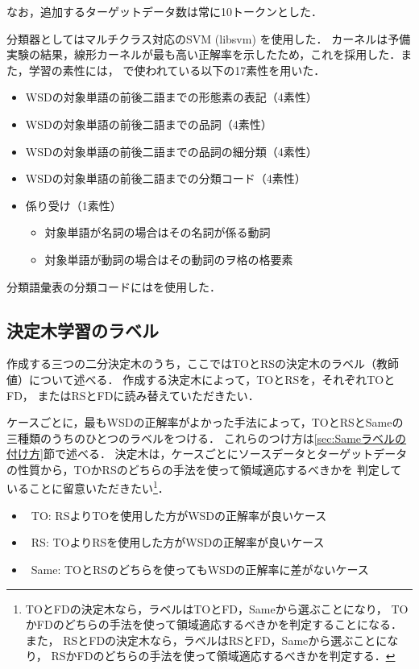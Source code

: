 \documentclass[japanese]{jnlp_1.4}
\begin{document}
なお，追加するターゲットデータ数は常に10トークンとした．

分類器としてはマルチクラス対応のSVM (libsvm) を使用した．
カーネルは予備実験の結果，線形カーネルが最も高い正解率を示したため，これを採用した．また，学習の素性には，
\cite{article21}で使われている以下の17素性を用いた．

\begin{itemize}
\item WSDの対象単語の前後二語までの形態素の表記（4素性）
\item WSDの対象単語の前後二語までの品詞（4素性）
\item WSDの対象単語の前後二語までの品詞の細分類（4素性）
\item WSDの対象単語の前後二語までの分類コード（4素性）
\item 係り受け（1素性）
	\begin{itemize}
	\item 対象単語が名詞の場合はその名詞が係る動詞
	\item 対象単語が動詞の場合はその動詞のヲ格の格要素
	\end{itemize}
\end{itemize}

分類語彙表の分類コードには\cite{book1}を使用した．



\subsection{決定木学習のラベル}
\label{Sec:決定木学習のラベル}

作成する三つの二分決定木のうち，ここではTOとRSの決定木のラベル（教師値）について述べる．
作成する決定木によって，TOとRSを，それぞれTOとFD，
またはRSとFDに読み替えていただきたい．

ケースごとに，最もWSDの正解率がよかった手法によって，TOとRSとSameの三種類のうちのひとつのラベルをつける．
これらのつけ方は\ref{sec:Sameラベルの付け方}節で述べる．
決定木は，ケースごとにソースデータとターゲットデータの性質から，TOかRSのどちらの手法を使って領域適応するべきかを
判定していることに留意いただきたい\footnote{
	TOとFDの決定木なら，ラベルはTOとFD，Sameから選ぶことになり，
TOかFDのどちらの手法を使って領域適応するべきかを判定することになる．また，
RSとFDの決定木なら，ラベルはRSとFD，Sameから選ぶことになり，
RSかFDのどちらの手法を使って領域適応するべきかを判定する．}．

\begin{itemize}
\item\ TO: RSよりTOを使用した方がWSDの正解率が良いケース
\item\ RS: TOよりRSを使用した方がWSDの正解率が良いケース
\item\ Same: TOとRSのどちらを使ってもWSDの正解率に差がないケース
\end{itemize}
\end{document}
